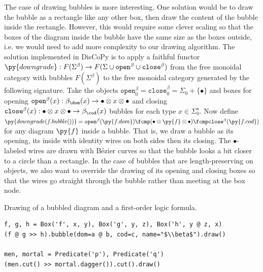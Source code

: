 The case of drawing bubbles is more interesting.
One solution would be to draw the bubble as a rectangle like any other box, then draw the content of the bubble inside the rectangle.
However, this would require some clever scaling so that the boxes of the diagram inside the bubble have the same size as the boxes outside, i.e. we would need to add more complexity to our drawing algorithm.
The solution implemented in DisCoPy is to apply a faithful functor $\py{downgrade} : F(\Sigma^\beta) \to F(\Sigma \cup \mathtt{open}^\beta \cup \mathtt{close}^\beta)$ from the free monoidal category with bubbles $F(\Sigma^\beta)$ to the free monoidal category generated by the following signature.
Take the objects $\mathtt{open}^\beta_0 = \mathtt{close}^\beta_0 = \Sigma_0 + \{ \bullet \}$ and boxes
for opening $\mathtt{open}^\beta(x) : \beta_\dom(x) \to \bullet \otimes x \otimes \bullet$ and closing $\mathtt{close}^\beta(x) : \bullet \otimes x \otimes \bullet \to \beta_\cod(x)$ bubbles for each type $x \in \Sigma_0^\star$.
Now define $\py{downgrade(f.bubble())} = \mathtt{open}^\beta(\py{f.dom}) \fcmp (\bullet \otimes \py{f} \otimes \bullet) \fcmp \mathtt{close}^\beta(\py{f.cod})$ for any diagram $\py{f}$ inside a bubble.
That is, we draw a bubble as its opening, its inside with identity wires on both sides then its closing.
The $\bullet$-labeled wires are drawn with Bézier curves so that the bubble looks a bit closer to a circle than a rectangle.
In the case of bubbles that are length-preserving on objects, we also want to override the drawing of its opening and closing boxes so that the wires go straight through the bubble rather than meeting at the box node.

\begin{example}
{\normalfont Drawing of a bubbled diagram and a first-order logic formula.}

\begin{verbatim}
f, g, h = Box('f', x, y), Box('g', y, z), Box('h', y @ z, x)
(f @ g >> h).bubble(dom=a @ b, cod=c, name="$\\beta$").draw()

men, mortal = Predicate('p'), Predicate('q')
(men.cut() >> mortal.dagger()).cut().draw()
\end{verbatim}

\begin{center}
\hspace{100pt}
\end{center}
\end{example}


